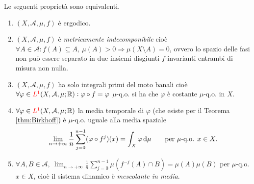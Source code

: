 \begin{thm}
    Le seguenti proprietà sono equivalenti.
    \begin{enumerate}[label=(\roman*)]
        \item $ (X, \mathcal{A}, \mu, f) $ è ergodico.
        \item $ (X, \mathcal{A}, \mu, f) $ è \emph{metricamente indecomponibile} cioè $ \forall A \in \mathcal{A} : f(A) \subseteq A, \ \mu(A) > 0 \Rightarrow \mu(X \setminus A) = 0 $, ovvero lo spazio delle fasi non può essere separato in due insiemi disgiunti $ f $-invarianti entrambi di misura non nulla.
        \item $ (X, \mathcal{A}, \mu, f) $ ha solo integrali primi del moto banali cioè $ \forall \varphi \in \textcolor{red}{L^1}(X, \mathcal{A}, \mu; \mathbb{R}) : \varphi \circ f = \varphi $ $ \mu $-q.o. si ha che $ \varphi $ è costante $ \mu $-q.o. in $ X $.
        \item $ \forall \varphi \in \textcolor{red}{L^1}(X, \mathcal{A}, \mu; \mathbb{R}) $ la media temporale di $ \varphi $ (che esiste per il Teorema \ref{thm:Birkhoff}) è $ \mu $-q.o. uguale alla media spaziale
        \[
            \lim_{n \to +\infty} \frac{1}{n} \sum_{j=0}^{n-1} (\varphi \circ f^j)(x) = \int_{X} \varphi \dif{\mu} \qquad \text{per } \mu\text{-q.o. } x \in X.
        \]
        \item $ \forall A, B \in \mathcal{A}, \ \displaystyle{\lim_{n \to +\infty} \frac{1}{n} \sum_{j=0}^{n-1} \mu(f^{-j}(A) \cap B) = \mu(A) \mu(B)} $ per $ \mu $-q.o. $ x \in X $, cioè il sistema dinamico è \emph{mescolante in media}.
    \end{enumerate}
\end{thm}
